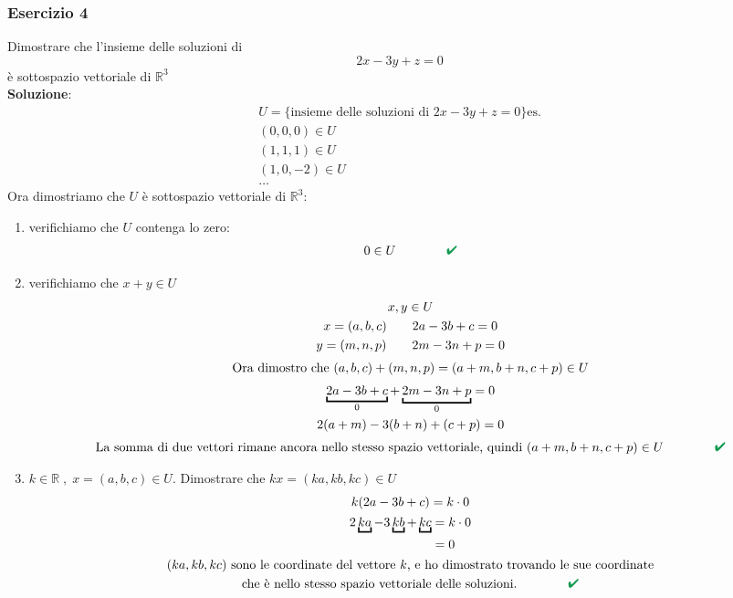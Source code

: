\documentclass[italian]{article}
\renewcommand{\checkmark}{\textcolor{ForestGreen}{\text{$\qquad$\ding{52}}}}
\newcommand{\ins}[1]{\text{$\mathbb{#1}$}}
\begin{document}
\subsubsection{Esercizio 4}
Dimostrare che l'insieme delle soluzioni di
\[
	2x-3y+z = 0
\]
è sottospazio vettoriale di $\ins{R}^3$\\[2mm]
\textbf{Soluzione}:
\begin{gather*}
	U = \{ \text{insieme delle soluzioni di } 2x-3y+z = 0 \}
	\text{es.}\\
	(0,0,0) \in U\\
	(1,1,1) \in U\\
	(1,0,-2) \in U\\
	\dots
\end{gather*}
Ora dimostriamo che $U$  è sottospazio vettoriale di $\ins{R}^3$:
\begin{enumerate}
	\item verifichiamo che $U$ contenga lo zero:
		\begin{gather*}
		0 \in U \qquad \checkmark
		\end{gather*}
	\item verifichiamo che $x + y \in U $
		\begin{gather*}
			x,y \in U\\
			x=(a,b,c) \qquad 2a - 3b + c = 0 \\
			y=(m,n,p) \qquad 2m - 3n + p = 0 \\[1mm]
			\text{Ora dimostro che $(a,b,c) + (m,n,p) = (a+m,b+n,c+p) \in U$}\\[1mm]
			\underbracket{2a - 3b + c}_{0} + \underbracket{2m - 3n + p}_{0}= 0\\
			2(a+m)- 3(b+n) + (c+p) = 0\\[1mm]
			\text{La somma di due vettori rimane ancora nello stesso spazio vettoriale, quindi $ (a+m,b+n,c+p) \in U \qquad \checkmark$}
		\end{gather*}
	\pagebreak
	\item $k \in \ins{R} \;,\; x=(a,b,c) \in U$. Dimostrare che $kx = (ka,kb,kc) \in U$
	\begin{gather*}
		k(2a-3b+c)=k\cdot 0\\
		\begin{split}
			2\underbracket{ka}-3\underbracket{kb}+\underbracket{kc} &= k\cdot 0\\
			&= 0
		\end{split}\\
		\text{$(ka,kb,kc)$ sono le coordinate del vettore $k$, e ho dimostrato trovando le sue coordinate}\\
		\text{che è nello stesso spazio vettoriale delle soluzioni.}  \qquad \checkmark
	\end{gather*}
\end{enumerate}
\end{document}
